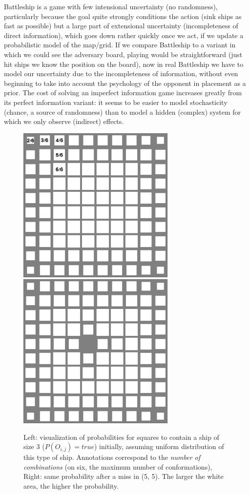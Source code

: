 Battleship is a game with few intensional uncertainty (no randomness), particularly because the goal quite strongly conditions the action (sink ships as fast as possible) but a large part of extensional uncertainty (incompleteness of direct information), which goes down rather quickly once we act, if we update a probabilistic model of the map/grid. If we compare Battleship to a variant in which we could see the adversary board, playing would be straightforward (just hit ships we know the position on the board), now in real Battleship we have to model our uncertainty due to the incompleteness of information, without even beginning to take into account the psychology of the opponent in placement as a prior. The cost of solving an imperfect information game increases greatly from its perfect information variant: it seems to be easier to model stochasticity (chance, a source of randomness) than to model a hidden (complex) system for which we only observe (indirect) effects.

\begin{figure}[h!]
\begin{center}
\includegraphics[width=7.8cm]{images/battleship_board_3_init_annotated.png} \includegraphics[width=7.8cm]{images/battleship_board_3_1miss.png}
\caption{Left: visualization of probabilities for squares to contain a ship of size 3 ($P(O_{i,j})=true$) initially, assuming uniform distribution of this type of ship. Annotations correspond to the \textit{number of combinations} (on six, the maximum number of conformations), Right: same probability after a miss in (5, 5). The larger the white area, the higher the probability.}
\label{fig:battleship}
\end{center}
\end{figure}


